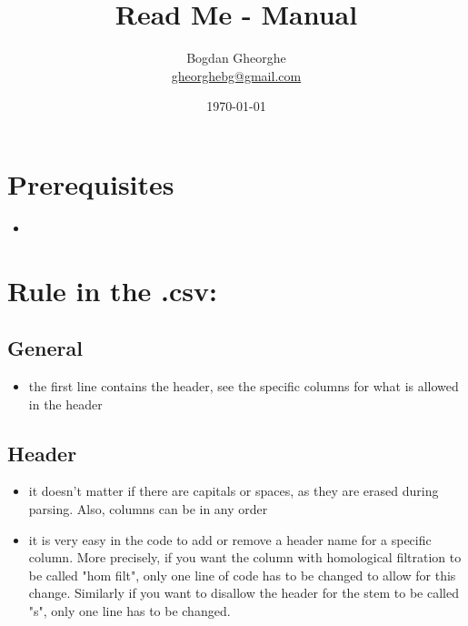 \documentclass[a4paper,11pt]{article}
\title{Read Me - Manual}
\author{Bogdan Gheorghe\\ \url{gheorghebg@gmail.com}}
\date{\today}
\begin{document}
\maketitle

\section{Prerequisites}

\begin{itemize}
	\item 
\end{itemize}




\section{Rule in the .csv:}

\subsection{General}
\begin{itemize}
	\item the first line contains the header, see the specific columns for what is allowed in the header
\end{itemize}
		
\subsection{Header}

\begin{itemize}
	\item it doesn't matter if there are capitals or spaces, as they are erased during parsing. Also, columns can be in any order
	\item it is very easy in the code to add or remove a header name for a specific column. More precisely, if you want the column with homological filtration to be called "hom filt", only one line of code has to be changed to allow for this change. Similarly if you want to disallow the header for the stem to be called "s", only one line has to be changed.

\end{itemize}
		
\end{document}
